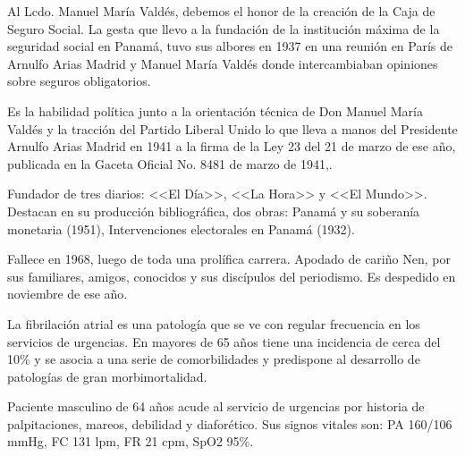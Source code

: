 \documentclass[a4paper]{article}
\let\cite=\supercite %
\begin{document}
\begin{multicols}{3}
Al Lcdo. Manuel María Valdés, debemos el honor de la creación de la Caja de Seguro Social. La gesta que llevo a la fundación de la institución máxima de la seguridad social en Panamá, tuvo sus albores en 1937 en una reunión en París de Arnulfo Arias Madrid y Manuel María Valdés donde intercambiaban opiniones sobre seguros obligatorios\cite{Pinock95}.

Es la habilidad política junto a la orientación técnica de Don Manuel María Valdés y la tracción del Partido Liberal Unido lo que lleva a manos del Presidente Arnulfo Arias Madrid en 1941 a la firma de la Ley 23 del 21 de marzo de ese año, publicada en la Gaceta Oficial No. 8481 de marzo de 1941\cite{Pinock95},\cite{gaceta1941}.

Fundador de tres diarios: <<El Día>>, <<La Hora>> y <<El Mundo>>. Destacan en su producción bibliográfica, dos obras: Panamá y su soberanía monetaria (1951), Intervenciones electorales en Panamá (1932)\cite{Leonard15}.

Fallece en 1968, luego de toda una prolífica carrera. Apodado de cariño Nen, por sus familiares, amigos, conocidos y sus discípulos del periodismo. Es despedido en noviembre de ese año\cite{Lot68}.

\closearticle



La fibrilación atrial es una patología que se ve con regular frecuencia en los servicios de urgencias. En mayores de 65 años tiene una incidencia de cerca del 10\% y se asocia a una serie de comorbilidades y predispone al desarrollo de patologías de gran morbimortalidad\cite{brundel_atrial_2022}.

\begin{boxClinica}

Paciente masculino de 64 años acude al servicio de urgencias por historia de palpitaciones, mareos, debilidad y diaforético. Sus signos vitales son: PA 160/106 mmHg, FC 131 lpm, FR 21 cpm, SpO2 95\%.

\end{boxClinica}

\closearticle

\printbibliography[heading=none]

\end{multicols}
\end{document}

